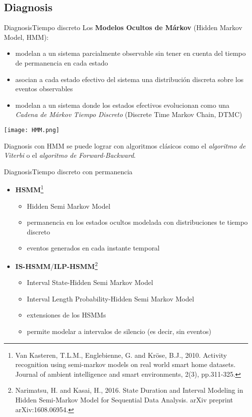 \documentclass[9pt, handout]{beamer}
\begin{document}
    \subsection{Diagnosis}
      \begin{frame}{Diagnosis}{Tiempo discreto}
        Los \textbf{Modelos Ocultos de Márkov} (Hidden Markov Model, HMM):
        \begin{itemize}
          \item modelan a un sistema parcialmente observable sin tener en cuenta del tiempo de permanencia en cada estado
          \item asocian a cada estado efectivo del sistema una distribución discreta sobre los eventos observables
          \item modelan a un sistema donde los estados efectivos evolucionan como una \textit{Cadena de Márkov Tiempo Discreto} (Discrete Time Markov Chain, DTMC)
          
        \end{itemize}
        \begin{center}
          \texttt{[image: HMM.png]}
        \end{center}
        Diagnosis con HMM se puede lograr con algoritmos clásicos como el \textit{algoritmo de Viterbi} o el \textit{algoritmo de Forward-Backward}.
      \end{frame}
      
      \begin{frame}{Diagnosis}{Tiempo discreto con permanencia}
        \begin{itemize}
          \item \textbf{HSMM}\footnote{Van Kasteren, T.L.M., Englebienne, G. and Kröse, B.J., 2010. Activity recognition using semi-markov models on real world smart home datasets. Journal of ambient intelligence and smart environments, 2(3), pp.311-325.}
          \begin{itemize}
            \item Hidden Semi Markov Model
            \item permanencia en los estados ocultos modelada con distribuciones te tiempo discreto
            \item eventos generados en cada instante temporal
          \end{itemize}
          \item \textbf{IS-HSMM}/\textbf{ILP-HSMM}\footnote{Narimatsu, H. and Kasai, H., 2016. State Duration and Interval Modeling in Hidden Semi-Markov Model for Sequential Data Analysis. arXiv preprint arXiv:1608.06954.}
          \begin{itemize}
            \item Interval State-Hidden Semi Markov Model
            \item Interval Length Probability-Hidden Semi Markov Model
            \item extensiones de los HSMMs
            \item permite modelar a intervalos de silencio (es decir, sin eventos)
          \end{itemize}
        \end{itemize}
      \end{frame}
      
\end{document}
